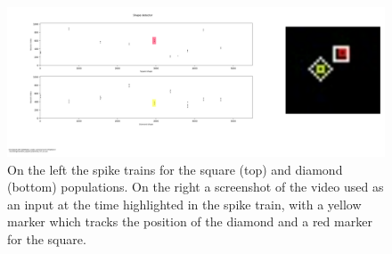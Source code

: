 \begin{figure}[ht]
\centering
\includegraphics[width=\textwidth]{images/development/shape_detectors.png}
\caption[Shapes Detector with Square and Diamond]{On the left the spike trains for the square (top) and diamond (bottom) populations. On the right a screenshot of the video used as an input at the time highlighted in the spike train, with a yellow marker which tracks the position of the diamond and a red marker for the square.}
\label{fig:shape_detectors}
\end{figure}

